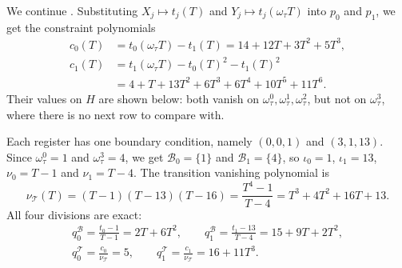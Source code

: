 \documentclass[../../book]{subfiles}
\begin{document}
\begin{example}\label{ex:stark-fibsq-4}
  We continue .
  Substituting $X_j \mapsto t_j(T)$ and $Y_j \mapsto t_j(\omega_\tau T)$ into $p_0$ and $p_1$, we get the constraint polynomials
  \begin{align*}
    c_0(T) &= t_0(\omega_\tau T) - t_1(T) = 14 + 12T + 3T^2 + 5T^3, \\
    c_1(T) &= t_1(\omega_\tau T) - t_0(T)^2 - t_1(T)^2 \\
           &= 4 + T + 13T^2 + 6T^3 + 6T^4 + 10T^5 + 11T^6.
  \end{align*}
  Their values on $H$ are shown below: both vanish on $\omega_\tau^0, \omega_\tau^1, \omega_\tau^2$, but not on $\omega_\tau^3$, where there is no next row to compare with.
  \begin{center}
  \end{center}
  Each register has one boundary condition, namely $(0, 0, 1)$ and $(3, 1, 13)$.
  Since $\omega_\tau^0 = 1$ and $\omega_\tau^3 = 4$, we get $\mathcal{B}_0 = \{1\}$ and $\mathcal{B}_1 = \{4\}$, so $\iota_0 = 1$, $\iota_1 = 13$, $\nu_0 = T - 1$ and $\nu_1 = T - 4$.
  The transition vanishing polynomial is
  \begin{equation*}
    \nu_{\mathcal{T}}(T) = (T - 1)(T - 13)(T - 16) = \frac{T^4 - 1}{T - 4} = T^3 + 4T^2 + 16T + 13.
  \end{equation*}
  All four divisions are exact:
  \begin{gather*}
    q^{\mathcal{B}}_0 = \frac{t_0 - 1}{T - 1} = 2T + 6T^2, \qquad
    q^{\mathcal{B}}_1 = \frac{t_1 - 13}{T - 4} = 15 + 9T + 2T^2, \\
    q^{\mathcal{T}}_0 = \frac{c_0}{\nu_{\mathcal{T}}} = 5, \qquad
    q^{\mathcal{T}}_1 = \frac{c_1}{\nu_{\mathcal{T}}} = 16 + 11T^3.
  \end{gather*}
\end{example}
\end{document}
